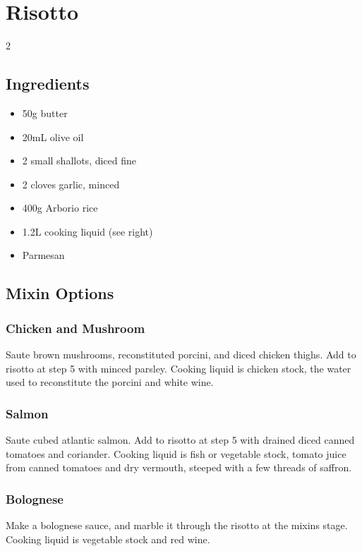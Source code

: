 \clearpage
\section{Risotto}


\begin{multicols}{2}
  \subsection{Ingredients}
    \begin{itemize}
      \item 50g butter
      \item 20mL olive oil
      \item 2 small shallots, diced fine
      \item 2 cloves garlic, minced
      \item 400g Arborio rice
      \item 1.2L cooking liquid (see right)
      \item Parmesan
    \end{itemize}

  \subsection{Mixin Options}

  \subsubsection{Chicken and Mushroom}
    Saute brown mushrooms, reconstituted porcini, and diced chicken thighs. Add to risotto at step 5 with minced parsley. Cooking liquid is chicken stock, the water used to reconstitute the porcini and white wine.

  \subsubsection{Salmon}
    Saute cubed atlantic salmon. Add to risotto at step 5 with drained diced canned tomatoes and coriander. Cooking liquid is fish or vegetable stock, tomato juice from canned tomatoes and dry vermouth, steeped with a few threads of saffron.

  \subsubsection{Bolognese}
    Make a bolognese sauce, and marble it through the risotto at the mixins stage. Cooking liquid is vegetable stock and red wine.


\end{multicols}
